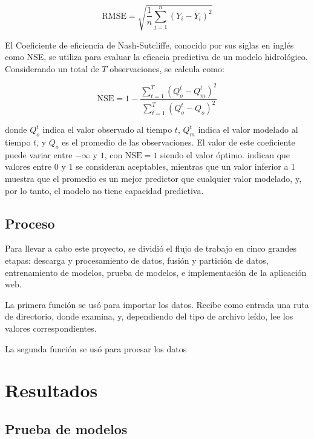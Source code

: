 \documentclass[hess, manuscript]{copernicus}
\begin{document}
\begin{equation}
  \mathrm{RMSE} = \sqrt{\dfrac{1}{n}\sum_{j=1}^{n} (Y_i-Y_i)^2}
\end{equation}

El Coeficiente de eficiencia de Nash-Sutcliffe, conocido por sus siglas en inglés como NSE, se utiliza para evaluar la eficacia predictiva de un modelo hidrológico. Considerando un total de $T$ observaciones, se calcula como:

\begin{equation}
  \mathrm{NSE} = 1 - \dfrac
  {\sum_{t=1}^T (Q_o^t-Q_m^t)^2}
  {\sum_{t=1}^T (Q_o^t-Q_o)^2}
\end{equation}

donde $Q_o^t$ indica el valor observado al tiempo $t$, $Q_m^t$ indica el valor modelado al tiempo $t$, y $Q_o$ es el promedio de las observaciones. El valor de este coeficiente puede variar entre $-\infty$ y $1$, con $\mathrm{NSE}=1$ siendo el valor óptimo. \citet{melsen_rise_2025} indican que valores entre 0 y 1 se consideran aceptables, mientras que un valor inferior a 1 muestra que el promedio es un mejor predictor que cualquier valor modelado, y, por lo tanto, el modelo no tiene capacidad predictiva.

\subsection{Proceso}
Para llevar a cabo este proyecto, se dividió el flujo de trabajo en cinco grandes etapas: descarga y procesamiento de datos, fusión y partición de datos, entrenamiento de modelos, prueba de modelos, e implementación de la aplicación web.

La primera función se usó para importar los datos. Recibe como entrada una ruta de directorio, donde examina, y, dependiendo del tipo de archivo leído, lee los valores correspondientes.

La segunda función se usó para proesar los datos

\section{Resultados}
\label{sec:Resultados}

\subsection{Prueba de modelos}
\end{document}
